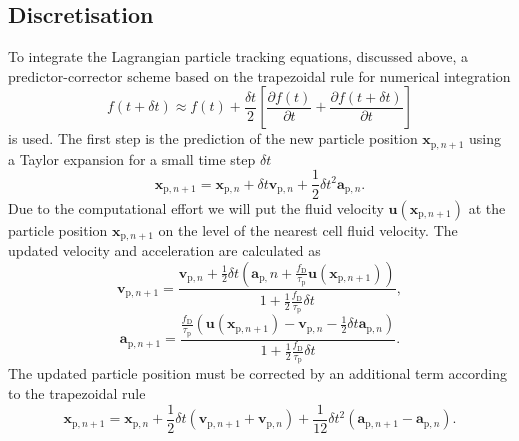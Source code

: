\documentclass[11pt,a4paper,openany,oneside,parskip=half*]{article}
\renewcommand*\vec[1]{\boldsymbol{#1}}
\begin{document}
\subsection{Discretisation}
To integrate the Lagrangian particle tracking equations, discussed above, a predictor-corrector scheme based on the trapezoidal rule for numerical integration
\begin{equation}
f (t + \delta t) \approx f(t) + \frac{\delta t}{2} \left[ \frac{\partial f(t)}{\partial t} + \frac{\partial f(t + \delta t)}{\partial t} \right ]
\end{equation}
is used.
\newline
The first step is the prediction of the new particle position $\vec{x}_{\mathrm{p}, n+1}$ using a Taylor expansion for a small time step $\delta t$
\begin{equation}
\vec{x}_{\mathrm{p}, n+1} = \vec{x}_{\mathrm{p}, n} + \delta t \vec{v}_{\mathrm{p}, n} + \frac{1}{2} \delta t^2 \vec{a}_{\mathrm{p}, n}.
\end{equation}
Due to the computational effort we will put the fluid velocity $\vec{u}(\vec{x}_{\mathrm{p}, n+1})$ at the particle position $\vec{x}_{\mathrm{p}, n+1}$ on the level of the nearest cell fluid velocity.
\newline
The updated velocity and acceleration are calculated as
\begin{equation}
\vec{v}_{\mathrm{p}, n+1} = \frac{\vec{v}_{\mathrm{p}, n} + \frac{1}{2} \delta t \left(\vec{a}_{\mathrm{p}, }n + \frac{f_\mathrm{D}}{\tau_\mathrm{p}}\vec{u}(\vec{x}_{\mathrm{p}, n+1}) \right)}{1 + \frac{1}{2} \frac{f_\mathrm{D}}{\tau_\mathrm{p}} \delta t},
\end{equation}
\begin{equation}
\vec{a}_{\mathrm{p}, n+1} = \frac{\frac{f_\mathrm{D}}{\tau_\mathrm{p}} \left(\vec{u}(\vec{x}_{\mathrm{p}, n+1}) - \vec{v}_{\mathrm{p}, n} - \frac{1}{2} \delta t \vec{a}_{\mathrm{p}, n} \right)}{1 + \frac{1}{2} \frac{f_\mathrm{D}}{\tau_\mathrm{p}} \delta t}.
\end{equation}
The updated particle position must be corrected by an additional term according to the trapezoidal rule
\begin{equation}
\vec{x}_{\mathrm{p}, n+1} = \vec{x}_{\mathrm{p}, n} + \frac{1}{2} \delta t \left( \vec{v}_{\mathrm{p}, n+1} + \vec{v}_{\mathrm{p}, n} \right) + \frac{1}{12} \delta t^2 \left( \vec{a}_{\mathrm{p}, n+1} - \vec{a}_{\mathrm{p}, n} \right).
\end{equation}
\end{document}
